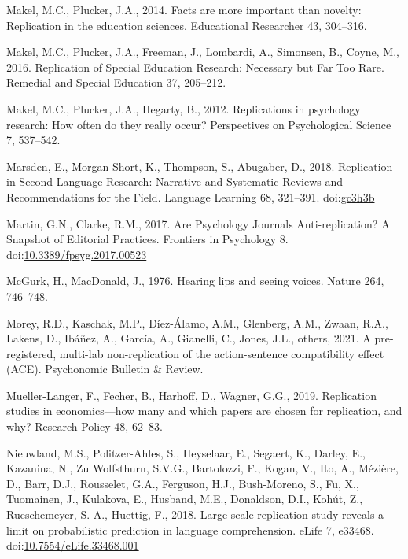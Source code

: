 \documentclass[]{elsarticle} %
\newlength{\cslhangindent}
\newlength{\cslentryspacingunit} %
\newenvironment{CSLReferences}[2] %
 {%
  \setlength{\parindent}{0pt}
  \ifodd #1
  \let\oldpar\par
  \def\par{\hangindent=\cslhangindent\oldpar}
  \fi
  \setlength{\parskip}{#2\cslentryspacingunit}
 }%
 {}
\begin{document}
\begin{CSLReferences}{1}{0}
\leavevmode\hypertarget{ref-makel_facts_2014}{}%
Makel, M.C., Plucker, J.A., 2014. Facts are more important than novelty: {Replication} in the education sciences. Educational Researcher 43, 304--316.

\leavevmode\hypertarget{ref-makel_replication_2016}{}%
Makel, M.C., Plucker, J.A., Freeman, J., Lombardi, A., Simonsen, B., Coyne, M., 2016. Replication of {Special} {Education} {Research}: {Necessary} but {Far} {Too} {Rare}. Remedial and Special Education 37, 205--212.

\leavevmode\hypertarget{ref-makel_replications_2012}{}%
Makel, M.C., Plucker, J.A., Hegarty, B., 2012. Replications in psychology research: {How} often do they really occur? Perspectives on Psychological Science 7, 537--542.

\leavevmode\hypertarget{ref-marsden_replication_2018}{}%
Marsden, E., Morgan‐Short, K., Thompson, S., Abugaber, D., 2018. Replication in {Second} {Language} {Research}: {Narrative} and {Systematic} {Reviews} and {Recommendations} for the {Field}. Language Learning 68, 321--391. doi:\href{https://doi.org/gc3h3b}{gc3h3b}

\leavevmode\hypertarget{ref-martin_are_2017}{}%
Martin, G.N., Clarke, R.M., 2017. Are {Psychology} {Journals} {Anti}-replication? {A} {Snapshot} of {Editorial} {Practices}. Frontiers in Psychology 8. doi:\href{https://doi.org/10.3389/fpsyg.2017.00523}{10.3389/fpsyg.2017.00523}

\leavevmode\hypertarget{ref-mcgurk1976hearing}{}%
McGurk, H., MacDonald, J., 1976. Hearing lips and seeing voices. Nature 264, 746--748.

\leavevmode\hypertarget{ref-morey2021pre}{}%
Morey, R.D., Kaschak, M.P., Díez-Álamo, A.M., Glenberg, A.M., Zwaan, R.A., Lakens, D., Ibáñez, A., García, A., Gianelli, C., Jones, J.L., others, 2021. A pre-registered, multi-lab non-replication of the action-sentence compatibility effect (ACE). Psychonomic Bulletin \& Review.

\leavevmode\hypertarget{ref-mueller2019replication}{}%
Mueller-Langer, F., Fecher, B., Harhoff, D., Wagner, G.G., 2019. Replication studies in economics---how many and which papers are chosen for replication, and why? Research Policy 48, 62--83.

\leavevmode\hypertarget{ref-nieuwland_large-scale_2018}{}%
Nieuwland, M.S., Politzer-Ahles, S., Heyselaar, E., Segaert, K., Darley, E., Kazanina, N., Zu Wolfsthurn, S.V.G., Bartolozzi, F., Kogan, V., Ito, A., Mézière, D., Barr, D.J., Rousselet, G.A., Ferguson, H.J., Bush-Moreno, S., Fu, X., Tuomainen, J., Kulakova, E., Husband, M.E., Donaldson, D.I., Kohút, Z., Rueschemeyer, S.-A., Huettig, F., 2018. Large-scale replication study reveals a limit on probabilistic prediction in language comprehension. eLife 7, e33468. doi:\href{https://doi.org/10.7554/eLife.33468.001}{10.7554/eLife.33468.001}


\end{CSLReferences}
\end{document}
